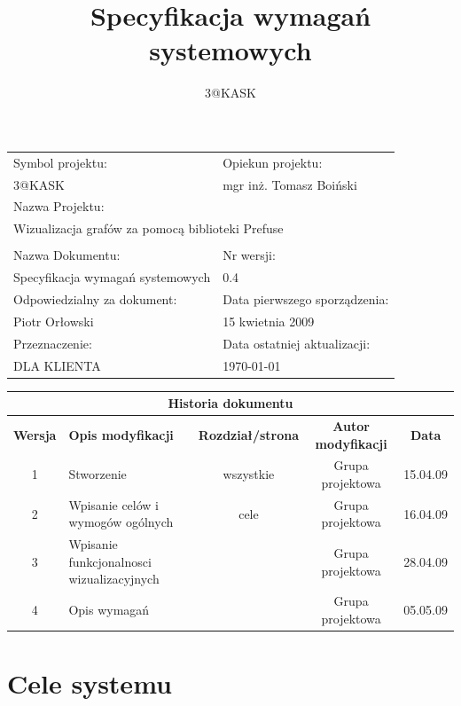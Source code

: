 \documentclass[a4paper,10pt]{article}
\title{Specyfikacja wymagań systemowych}
\author{3@KASK}
\begin{document}



\maketitle


\begin{center}
\begin{tabular}{|p{7cm}|p{7cm}|}
\hline
Symbol projektu: & Opiekun projektu:   \tabularnewline 
3@KASK & mgr inż. Tomasz Boiński    \tabularnewline \hline
\multicolumn{2}{|l|}{Nazwa Projektu: } \tabularnewline
\multicolumn{2}{|l|}{Wizualizacja grafów za pomocą biblioteki Prefuse } \tabularnewline 
\hline
\multicolumn{2}{l}{ } \tabularnewline %
\hline 
Nazwa Dokumentu: & Nr wersji:   \tabularnewline 
Specyfikacja wymagań systemowych & 0.4 \tabularnewline \hline
Odpowiedzialny za dokument: & Data pierwszego sporządzenia:   \tabularnewline 
Piotr Orłowski & 15 kwietnia 2009 \tabularnewline \hline
Przeznaczenie: & Data ostatniej aktualizacji:   \tabularnewline 
DLA KLIENTA & \today \tabularnewline \hline
\end{tabular}
\end{center}


\begin{center}
\begin{tabular}{|c|p{4cm}|c|c|c|}
\multicolumn{5}{c}{\textbf{Historia dokumentu}} \tabularnewline \hline
\textbf{Wersja} & \textbf{Opis modyfikacji} & \textbf{Rozdział/strona} & \textbf{Autor modyfikacji} & \textbf{Data} \tabularnewline \hline 
1 & Stworzenie & wszystkie & Grupa projektowa & 15.04.09 \tabularnewline \hline
2 & Wpisanie celów i wymogów ogólnych  & cele & Grupa projektowa & 16.04.09\tabularnewline \hline
3 & Wpisanie funkcjonalnosci wizualizacyjnych & & Grupa projektowa & 28.04.09\tabularnewline \hline
4 & Opis wymagań & & Grupa projektowa & 05.05.09\tabularnewline \hline
\end{tabular}
\end{center}


\newpage
\tableofcontents
\newpage

\section{Cele systemu}

\end{document}
